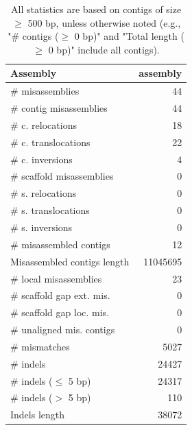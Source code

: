 \documentclass[12pt,a4paper]{article}
\begin{document}
\begin{table}[ht]
\begin{center}
\caption{All statistics are based on contigs of size $\geq$ 500 bp, unless otherwise noted (e.g., "\# contigs ($\geq$ 0 bp)" and "Total length ($\geq$ 0 bp)" include all contigs).}
\begin{tabular}{|l*{1}{|r}|}
\hline
Assembly & assembly \\ \hline
\# misassemblies & 44 \\ \hline
\hspace{2mm}\# contig misassemblies & 44 \\ \hline
\hspace{5mm}\# c. relocations & 18 \\ \hline
\hspace{5mm}\# c. translocations & 22 \\ \hline
\hspace{5mm}\# c. inversions & 4 \\ \hline
\hspace{2mm}\# scaffold misassemblies & 0 \\ \hline
\hspace{5mm}\# s. relocations & 0 \\ \hline
\hspace{5mm}\# s. translocations & 0 \\ \hline
\hspace{5mm}\# s. inversions & 0 \\ \hline
\# misassembled contigs & 12 \\ \hline
Misassembled contigs length & 11045695 \\ \hline
\# local misassemblies & 23 \\ \hline
\# scaffold gap ext. mis. & 0 \\ \hline
\# scaffold gap loc. mis. & 0 \\ \hline
\# unaligned mis. contigs & 0 \\ \hline
\# mismatches & 5027 \\ \hline
\# indels & 24427 \\ \hline
\hspace{5mm}\# indels ($\leq$ 5 bp) & 24317 \\ \hline
\hspace{5mm}\# indels ($>$ 5 bp) & 110 \\ \hline
Indels length & 38072 \\ \hline
\end{tabular}
\end{center}
\end{table}
\end{document}
